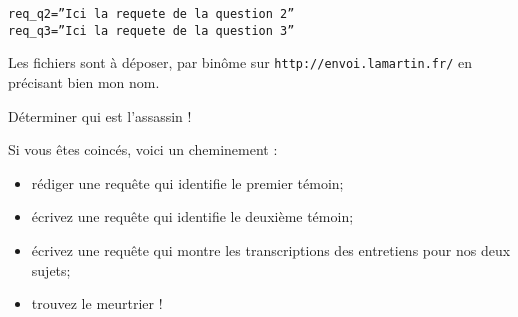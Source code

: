\noindent\texttt{req\_q2=''Ici la requete de la question 2''} \\
\texttt{req\_q3=''Ici la requete de la question 3''}

Les fichiers sont à déposer, par binôme sur \texttt{http://envoi.lamartin.fr/} en précisant bien mon nom.

\vspace{.5cm}

\question{}
Déterminer qui est l'assassin !



Si vous êtes coincés, voici un cheminement :
\begin{itemize}
\item rédiger une requête qui identifie le premier témoin;
\item écrivez une requête qui identifie le deuxième témoin;
\item écrivez une requête qui montre les transcriptions des entretiens pour nos deux sujets;
\item trouvez le meurtrier !
\end{itemize}




\newpage




